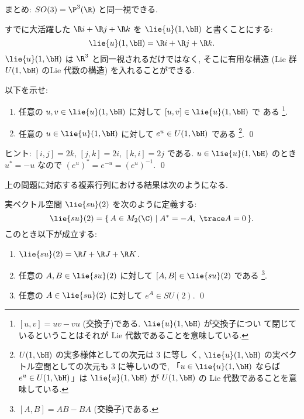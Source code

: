 \documentclass[12pt,twoside]{jarticle}
\begin{document}
\bigskip
\noindent
{\Large まとめ: $SO(3)=\P^3(\R)$ と同一視できる.}
\bigskip


すでに大活躍した $\R i+\R j+\R k$ を $\lie{u}(1,\bH)$ と書くことにする:
\begin{equation*}
  \lie{u}(1,\bH) = \R i+\R j+\R k.
\end{equation*}
$\lie{u}(1,\bH)$ は $\R^3$ と同一視されるだけではなく,
そこに有用な構造 (Lie 群 $U(1,\bH)$ のLie 代数の構造) を入れることができる.

\begin{question}
  以下を示せ:
  \begin{enumerate}
  \item 任意の $u,v\in\lie{u}(1,\bH)$ に対して $[u,v]\in \lie{u}(1,\bH)$ で
    ある%
    \footnote{$[u,v]=uv-vu$ (交換子)である. $\lie{u}(1,\bH)$ が交換子につい
      て閉じているということはそれが Lie 代数であることを意味している.}. 
  \item 任意の $u\in\lie{u}(1,\bH)$ に対して $e^u\in U(1,\bH)$ である%
    \footnote{$U(1,\bH)$ の実多様体としての次元は $3$ に等し
      く, $\lie{u}(1,\bH)$ の実ベクトル空間としての次元も $3$ に等しいので,
      「$u\in\lie{u}(1,\bH)$ ならば $e^u\in U(1,\bH)$」は $\lie{u}(1,\bH)$ 
      が $U(1,\bH)$ の Lie 代数であることを意味している.}.
    \qed
  \end{enumerate}
\end{question}

\noindent
ヒント: $[i,j]=2k$, $[j,k]=2i$, $[k,i]=2j$ である. 
$u\in\lie{u}(1,\bH)$ のとき $u^*=-u$ なので $(e^u)^*=e^{-u}=(e^u)^{-1}$.
\qed

\medskip

上の問題に対応する複素行列における結果は次のようになる.

\begin{question}
  実ベクトル空間 $\lie{su}(2)$ を次のように定義する:
  \begin{equation*}
    \lie{su}(2) = \{\, A\in M_2(\C)\mid A^*=-A,\ \trace A = 0\,\}.
  \end{equation*}
  このとき以下が成立する:
  \begin{enumerate}
  \item $\lie{su}(2)=\R I + \R J + \R K$.
  \item 任意の $A,B\in\lie{su}(2)$ に対して $[A,B]\in\lie{su}(2)$ である%
    \footnote{$[A,B]=AB-BA$ (交換子)である.}.
  \item 任意の $A\in\lie{su}(2)$ に対して $e^A\in SU(2)$.
    \qed
  \end{enumerate}
\end{question}
\end{document}
